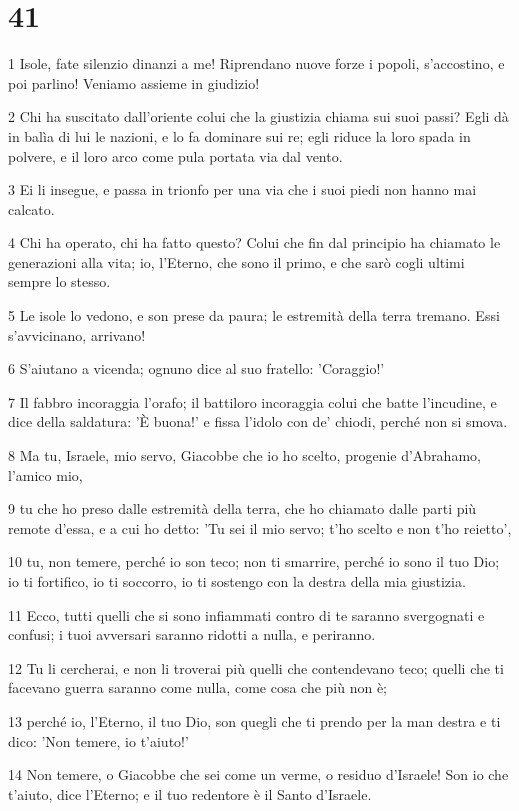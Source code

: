 \chapter{41}

\par 1 Isole, fate silenzio dinanzi a me! Riprendano nuove forze i popoli, s'accostino, e poi parlino! Veniamo assieme in giudizio!
\par 2 Chi ha suscitato dall'oriente colui che la giustizia chiama sui suoi passi? Egli dà in balìa di lui le nazioni, e lo fa dominare sui re; egli riduce la loro spada in polvere, e il loro arco come pula portata via dal vento.
\par 3 Ei li insegue, e passa in trionfo per una via che i suoi piedi non hanno mai calcato.
\par 4 Chi ha operato, chi ha fatto questo? Colui che fin dal principio ha chiamato le generazioni alla vita; io, l'Eterno, che sono il primo, e che sarò cogli ultimi sempre lo stesso.
\par 5 Le isole lo vedono, e son prese da paura; le estremità della terra tremano. Essi s'avvicinano, arrivano!
\par 6 S'aiutano a vicenda; ognuno dice al suo fratello: 'Coraggio!'
\par 7 Il fabbro incoraggia l'orafo; il battiloro incoraggia colui che batte l'incudine, e dice della saldatura: 'È buona!' e fissa l'idolo con de' chiodi, perché non si smova.
\par 8 Ma tu, Israele, mio servo, Giacobbe che io ho scelto, progenie d'Abrahamo, l'amico mio,
\par 9 tu che ho preso dalle estremità della terra, che ho chiamato dalle parti più remote d'essa, e a cui ho detto: 'Tu sei il mio servo; t'ho scelto e non t'ho reietto',
\par 10 tu, non temere, perché io son teco; non ti smarrire, perché io sono il tuo Dio; io ti fortifico, io ti soccorro, io ti sostengo con la destra della mia giustizia.
\par 11 Ecco, tutti quelli che si sono infiammati contro di te saranno svergognati e confusi; i tuoi avversari saranno ridotti a nulla, e periranno.
\par 12 Tu li cercherai, e non li troverai più quelli che contendevano teco; quelli che ti facevano guerra saranno come nulla, come cosa che più non è;
\par 13 perché io, l'Eterno, il tuo Dio, son quegli che ti prendo per la man destra e ti dico: 'Non temere, io t'aiuto!'
\par 14 Non temere, o Giacobbe che sei come un verme, o residuo d'Israele! Son io che t'aiuto, dice l'Eterno; e il tuo redentore è il Santo d'Israele.
